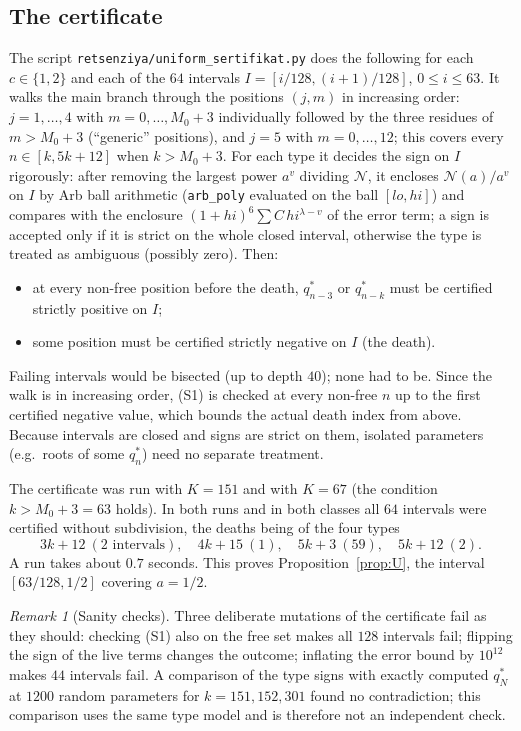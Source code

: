 \documentclass[11pt]{amsart}
\theoremstyle{definition}
\theoremstyle{remark}
\newtheorem{remark}[theorem]{Remark}
\begin{document}
\subsection{The certificate}
The script \texttt{retsenziya/uniform\_sertifikat.py} does the following for each
$c\in\{1,2\}$ and each of the $64$ intervals $I=[i/128,(i+1)/128]$, $0\le i\le 63$.
It walks the main branch through the positions $(j,m)$ in increasing order:
$j=1,\dots,4$ with $m=0,\dots,M_0+3$ individually followed by the three residues of
$m>M_0+3$ (``generic'' positions), and $j=5$ with $m=0,\dots,12$; this covers every
$n\in[k,5k+12]$ when $k>M_0+3$. For each type it decides the sign on $I$ rigorously:
after removing the largest power $a^v$ dividing $\mathcal{N}$, it encloses
$\mathcal{N}(a)/a^v$ on $I$ by Arb ball arithmetic (\texttt{arb\_poly} evaluated on
the ball $[lo,hi]$) and compares with the enclosure
$(1+hi)^6\sum C\,hi^{\lambda-v}$ of the error term; a sign is accepted only if it is
strict on the whole closed interval, otherwise the type is treated as ambiguous
(possibly zero). Then:
\begin{itemize}
\item[(S1)] at every non-free position before the death, $q^*_{n-3}$ or $q^*_{n-k}$
must be certified strictly positive on $I$;
\item[(S2)] some position must be certified strictly negative on $I$ (the death).
\end{itemize}
Failing intervals would be bisected (up to depth $40$); none had to be.
Since the walk is in increasing order, (S1) is checked at every non-free $n$ up to the
first certified negative value, which bounds the actual death index from above.
Because intervals are closed and signs are strict on them, isolated parameters
(e.g.\ roots of some $q^*_n$) need no separate treatment.

The certificate was run with $K=151$ and with $K=67$ (the condition $k>M_0+3=63$
holds). In both runs and in both classes all $64$ intervals were certified without
subdivision, the deaths being of the four types
\[
3k+12\ (2\text{ intervals}),\quad 4k+15\ (1),\quad 5k+3\ (59),\quad 5k+12\ (2).
\]
A run takes about $0.7$ seconds. This proves Proposition~\ref{prop:U}, the interval
$[63/128,1/2]$ covering $a=1/2$.

\begin{remark}[Sanity checks]
Three deliberate mutations of the certificate fail as they should: checking (S1)
also on the free set makes all $128$ intervals fail; flipping the sign of the live
terms changes the outcome; inflating the error bound by $10^{12}$ makes $44$
intervals fail. A comparison of the type signs with exactly computed $q^*_N$ at
$1200$ random parameters for $k=151,152,301$ found no contradiction; this comparison
uses the same type model and is therefore not an independent check.
\end{remark}
\end{document}
